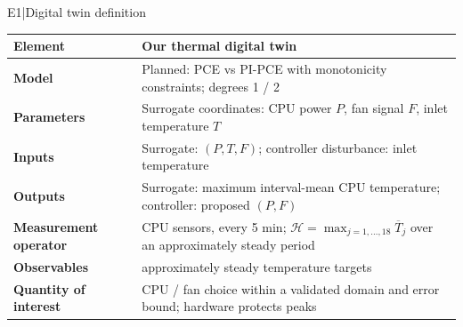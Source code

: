 \begin{frame}[more-space,label=backup-E1]{E1\enspace|\enspace Digital twin definition}
  {\normalfont\small
  \renewcommand{\arraystretch}{1.35}
  \setlength{\tabcolsep}{4pt}
  \begin{tabular}{@{}p{}p{}@{}}
    \toprule
    \textbf{Element} & \textbf{Our thermal digital twin}\\
    \midrule
    \textbf{Model} & \mdseries
      Planned: PCE vs PI-PCE with monotonicity constraints; degrees 1 / 2\\
    \midrule
    \textbf{Parameters} & \mdseries
      Surrogate coordinates: CPU power $P$, fan signal $F$, inlet temperature $T$\\
    \midrule
    \textbf{Inputs} & \mdseries
      Surrogate: $(P,T,F)$; controller disturbance: inlet temperature\\
    \midrule
    \textbf{Outputs} & \mdseries
      Surrogate: maximum interval-mean CPU temperature; controller: proposed $(P,F)$\\
    \midrule
    \textbf{Measurement operator} & \mdseries
      18 CPU sensors, every 5 min; $\mathcal H=\max_{j=1,\ldots,18}\overline{T}_j$ over an approximately steady period\\
    \midrule
    \textbf{Observables} & \mdseries
      19 approximately steady temperature targets\\
    \midrule
    \textbf{Quantity of interest} & \mdseries
      CPU / fan choice within a validated domain and error bound; hardware protects peaks\\
    \bottomrule
  \end{tabular}
  }
\end{frame}

\renewcommand{\backupcode}{E2}

